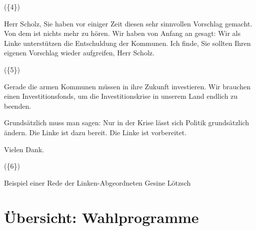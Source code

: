 \begin{example}[H]
    (\{4\})
    
    Herr Scholz, Sie haben vor einiger Zeit diesen sehr sinnvollen Vorschlag gemacht. Von dem ist nichts mehr zu hören. Wir haben von Anfang an gesagt: Wir als Linke unterstützen die Entschuldung der Kommunen. Ich finde, Sie sollten Ihren eigenen Vorschlag wieder aufgreifen, Herr Scholz.
    
    (\{5\})
    
    Gerade die armen Kommunen müssen in ihre Zukunft investieren. Wir brauchen einen Investitionsfonds, um die Investitionskrise in unserem Land endlich zu beenden.
    
    Grundsätzlich muss man sagen: Nur in der Krise lässt sich Politik grundsätzlich ändern. Die Linke ist dazu bereit. Die Linke ist vorbereitet.
    
    Vielen Dank.
    
    (\{6\})
    \caption{Beispiel einer Rede der Linken-Abgeordneten Gesine Lötzsch \autocite{richter_open_2021}} \label{list:exampleSpeechSpd}
\end{example}

\clearpage

\section{Übersicht: Wahlprogramme}

